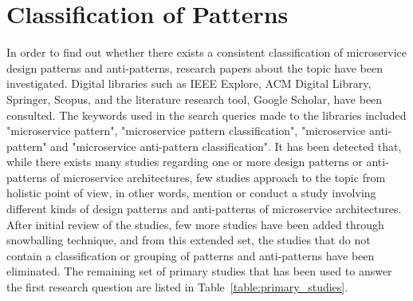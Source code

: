 \documentclass{Configuration_Files/PoliMi3i_thesis}
\begin{document}
\section{Classification of Patterns}
\label{subsec:classification_result}

In order to find out whether there exists a consistent classification of microservice design patterns and anti-patterns, research papers about the topic have been investigated.
Digital libraries such as IEEE Explore, ACM Digital Library, Springer, Scopus, and the literature research tool, Google Scholar, have been consulted.
The keywords used in the search queries made to the libraries included "microservice pattern", "microservice pattern classification", "microservice anti-pattern" and "microservice anti-pattern classification".
It has been detected that, while there exists many studies regarding one or more design patterns or anti-patterns of microservice architectures, few studies approach to the topic from holistic point of view, in other words, mention or conduct a study involving different kinds of design patterns and anti-patterns of microservice architectures.
After initial review of the studies, few more studies have been added through snowballing technique, and from this extended set, the studies that do not contain a classification or grouping of patterns and anti-patterns have been eliminated.
The remaining set of primary studies that has been used to answer the first research question are listed in Table~\ref{table:primary_studies}. 
\end{document}
